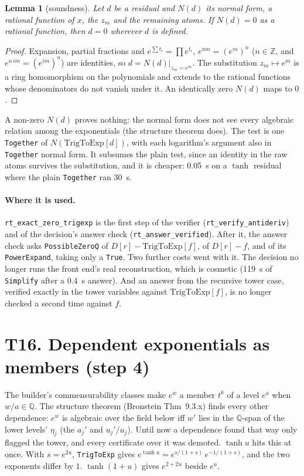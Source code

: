 \documentclass[11pt]{article}
\newtheorem{lemma}[theorem]{Lemma}
\theoremstyle{definition}
\theoremstyle{remark}
\newcommand{\Q}{\mathbb{Q}}
\newcommand{\Z}{\mathbb{Z}}
\newcommand{\code}[1]{\texttt{#1}}
\begin{document}
\begin{lemma}[soundness]\label{lem:T15}
Let $d$ be a residual and $N(d)$ its normal form, a rational function of $x$, the $z_m$ and
the remaining atoms. If $N(d)=0$ as a rational function, then $d=0$ wherever $d$ is defined.
\end{lemma}
\begin{proof}
Expansion, partial fractions and $e^{\sum t_i}=\prod e^{t_i}$, $e^{nm}=(e^{m})^{n}$
($n\in\Z$, and $e^{n\,i m}=(e^{i m})^{n}$) are identities, so $d=N(d)|_{z_m=e^{m}}$. The
substitution $z_m\mapsto e^{m}$ is a ring homomorphism on the polynomials and extends to
the rational functions whose denominators do not vanish under it. An identically zero
$N(d)$ maps to $0$.
\end{proof}
\noindent A non-zero $N(d)$ proves nothing: the normal form does not see every algebraic
relation among the exponentials (the structure theorem does). The test is one
\code{Together} of $N(\mathrm{TrigToExp}[d])$, with each logarithm's argument also in
\code{Together} normal form. It subsumes the plain test, since an identity in the raw atoms
survives the substitution, and it is cheaper: 0.05~s on a $\tanh$ residual where the plain
\code{Together} ran 30~s.

\paragraph{Where it is used.} \code{rt\_exact\_zero\_trigexp} is the first step of the
verifier (\code{rt\_verify\_antideriv}) and of the decision's answer check
(\code{rt\_answer\_verified}). After it, the answer check asks \code{PossibleZeroQ} of
$D[r]-\mathrm{TrigToExp}[f]$, of $D[r]-f$, and of its \code{PowerExpand}, taking only a
\code{True}. Two further costs went with it. The decision no longer runs the front end's
real reconstruction, which is cosmetic (119~s of \code{Simplify} after a 0.4~s answer).
And an answer from the recursive tower case, verified exactly in the tower variables
against $\mathrm{TrigToExp}[f]$, is no longer checked a second time against $f$.

\section*{T16. Dependent exponentials as members (step 4)}
\label{sec:T16}

The builder's commensurability classes make $e^{w}$ a member $t^{k}$ of a level
$e^{a}$ when $w/a\in\Q$. The structure theorem (Bronstein Thm~9.3.x) finds every other
dependence: $e^{w}$ is algebraic over the field below iff $w'$ lies in the $\Q$-span of
the lower levels' $\eta_j$ (the $a_j'$ and $u_j'/u_j$). Until now a dependence found that
way only flagged the tower, and every certificate over it was demoted. $\tanh u$ hits this
at once. With $s=e^{2u}$, \code{TrigToExp} gives $e^{\tanh u}=e^{s/(1+s)}\,e^{-1/(1+s)}$,
and the two exponents differ by $1$. $\tanh(1+u)$ gives $e^{2+2u}$ beside $e^{u}$.
\end{document}
